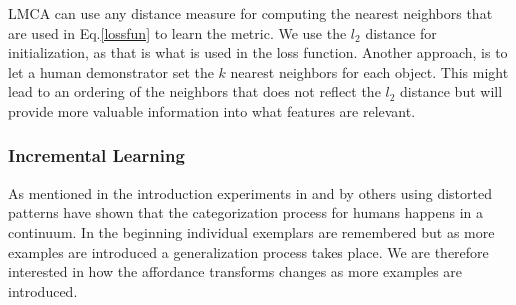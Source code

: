 LMCA can use any distance measure for computing the nearest neighbors
that are used in Eq.\ref{lossfun} to learn the metric. We use the
\(l_2\) distance for initialization, as that is what is used in the loss
function. Another approach, is to let a human demonstrator set the \(k\)
nearest neighbors for each object. This might lead to an ordering of the
neighbors that does not reflect the \(l_2\) distance but will provide
more valuable information into what features are relevant.

\subsubsection{Incremental Learning}\label{incremental-learning}

As mentioned in the introduction experiments in \cite{POSNER:1967ef} and
by others using distorted patterns have shown that the categorization
process for humans happens in a continuum. In the beginning individual
exemplars are remembered but as more examples are introduced a
generalization process takes place. We are therefore interested in how
the affordance transforms changes as more examples are introduced.


